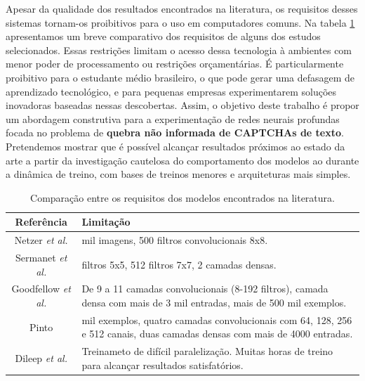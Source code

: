 Apesar da qualidade dos resultados encontrados na literatura, os requisitos desses sistemas tornam-os proibitivos para o uso em computadores comuns. Na tabela \ref{tableredes} apresentamos um breve comparativo dos requisitos de alguns dos estudos selecionados. Essas restrições limitam o acesso dessa tecnologia à ambientes com menor poder de processamento ou restrições orçamentárias. É particularmente proibitivo para o estudante médio brasileiro, o que pode gerar uma defasagem de aprendizado tecnológico, e para pequenas empresas experimentarem soluções inovadoras baseadas nessas descobertas. Assim, o objetivo deste trabalho é propor um abordagem construtiva para a experimentação de redes neurais profundas focada no problema de \textbf{quebra não informada de CAPTCHAs de texto}. Pretendemos mostrar que é possível alcançar resultados próximos ao estado da arte a partir da investigação cautelosa do comportamento dos modelos ao durante a dinâmica de treino, com bases de treinos menores e arquiteturas mais simples. 


\begin{table}[ht]
\begin{center}
	\begin{tabular}{ c | >{\centering\arraybackslash}m{7cm}  }
		Referência & Limitação  \\ %
		\hline
		Netzer \textit{et al.}     \cite{netzer2011reading}         &  600 mil imagens, 500 filtros convolucionais 8x8.  \\ \hline
		Sermanet \textit{et al.}   \cite{sermanet2012convolutional} &  16 filtros 5x5, 512 filtros 7x7, 2 camadas densas. \\ \hline
		Goodfellow \textit{et al.} \cite{captcha_break_2013}        &  De 9 a 11 camadas convolucionais (8-192 filtros), camada densa com mais de 3 mil entradas, mais de 500 mil exemplos.   \\ \hline
		Pinto \cite{otaro}											& 180 mil exemplos, quatro camadas convolucionais com 64, 128, 256 e 512 canais, duas camadas densas com mais de 4000 entradas.\\ \hline
		Dileep \textit{et al.} \cite{captcha_break_2017}			& Treinameto de difícil paralelização. Muitas horas de treino para alcançar resultados satisfatórios.\\ \hline
\end{tabular}
	\caption{Comparação entre os requisitos dos modelos encontrados na literatura.}
	\label{tableredes}
\end{center}
\end{table}
